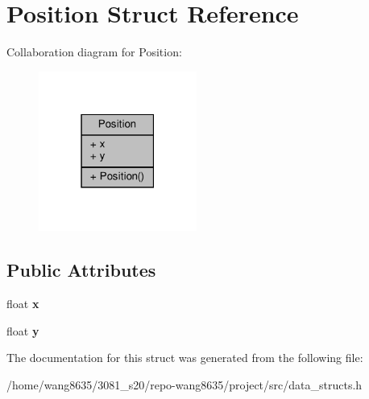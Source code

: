 \hypertarget{structPosition}{}\section{Position Struct Reference}
\label{structPosition}


Collaboration diagram for Position\+:\nopagebreak
\begin{figure}[H]
\begin{center}
\leavevmode
\includegraphics[width=147pt]{structPosition__coll__graph}
\end{center}
\end{figure}
\subsection*{Public Attributes}
\begin{DoxyCompactItemize}
\item 
\mbox{\label{structPosition_af684446cbf0f6d53386686283da6dcc6}} 
float {\bfseries x}
\item 
\mbox{\label{structPosition_a54a6182b5f7539295b32255808897d3f}} 
float {\bfseries y}
\end{DoxyCompactItemize}


The documentation for this struct was generated from the following file\+:\begin{DoxyCompactItemize}
\item 
/home/wang8635/3081\+\_\+s20/repo-\/wang8635/project/src/data\+\_\+structs.\+h\end{DoxyCompactItemize}
